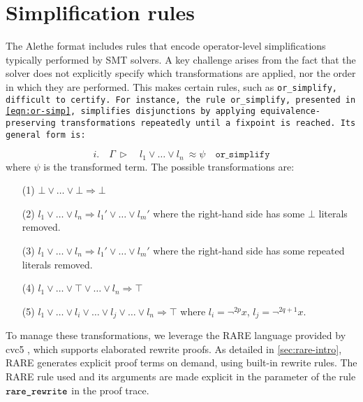 \section{Simplification rules}

The Alethe format includes rules that encode operator-level simplifications typically performed by SMT solvers. 
A key challenge arises from the fact that the solver does not explicitly specify which transformations are applied, nor the order in which they are performed. This makes certain rules, such as \tt{or\_simplify}, difficult to certify.
For instance, the rule \texttt{or\_simplify}, presented in \cref{eqn:or-simp}, simplifies disjunctions by applying equivalence-preserving transformations repeatedly until a fixpoint is reached. Its general form is:

\begin{equation}\label{eqn:or-simp}
i. \quad \Gamma~\triangleright \quad l_1 \lor \dots \lor l_n ~ \approx \psi \quad \texttt{or\_simplify}
\end{equation}
where $\psi$ is the transformed term. The possible transformations are:
\begin{enumerate}
\item[(1)] $\bot \lor \dots \lor \bot \Rightarrow \bot$
\item[(2)] $l_1 \lor \dots \lor l_n \Rightarrow l_1' \lor \dots \lor l_m'$ where the right-hand side has some $\bot$ literals removed.
\item[(3)]  $l_1 \lor \dots \lor l_n \Rightarrow l_1' \lor \dots \lor l_m'$ where the right-hand side has some repeated literals removed.
\item[(4)] $l_1 \lor \dots \lor \top \lor \dots \lor l_n \Rightarrow \top$
\item[(5)] $l_1 \lor \dots \lor l_i \lor \dots \lor l_j \lor \dots \lor  l_n \Rightarrow \top$ where $l_i = \neg^{2p} x$, $l_j = \neg^{2q+1} x$.
\end{enumerate}

To manage these transformations, we leverage the RARE language provided by cvc5 \cite{rare}, which supports elaborated rewrite proofs.
As detailed in \cref{sec:rare-intro}, RARE generates explicit proof terms on demand, using built-in rewrite rules.
The RARE rule used and its arguments are made explicit in the  parameter of the rule $\texttt{\upshape{rare\_rewrite}}$ in the proof trace.

